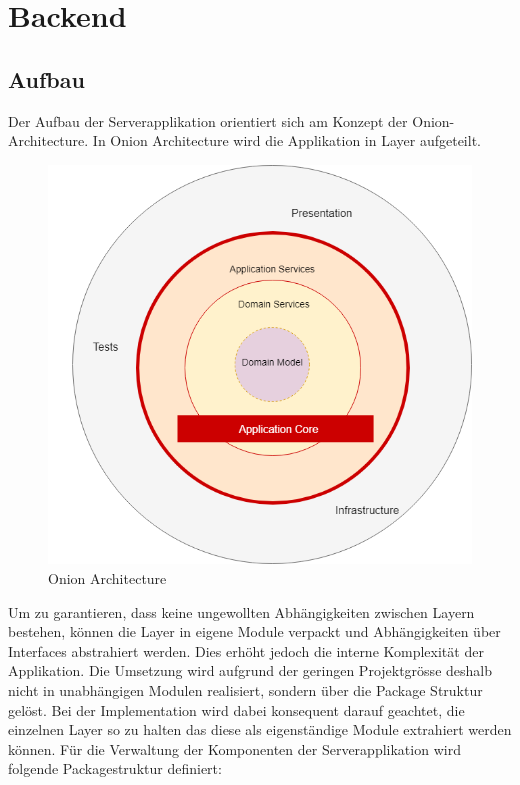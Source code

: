 \section{Backend}

\subsection{Aufbau}

Der Aufbau der Serverapplikation orientiert sich am Konzept der Onion-Architecture.
In Onion Architecture wird die Applikation in Layer aufgeteilt.

\begin{figure}[h]
    \centering
    \begin{minipage}[b]{0.4\textwidth}
        \includegraphics[width=\textwidth]{graphics/thinktocode-onion}
        \caption{Onion Architecture}
    \end{minipage}
\end{figure}

Um zu garantieren, dass keine ungewollten Abhängigkeiten zwischen Layern bestehen, können die Layer in eigene Module verpackt und Abhängigkeiten über Interfaces abstrahiert werden.
Dies erhöht jedoch die interne Komplexität der Applikation.
Die Umsetzung wird aufgrund der geringen Projektgrösse deshalb nicht in unabhängigen Modulen realisiert, sondern über die Package Struktur gelöst.
Bei der Implementation wird dabei konsequent darauf geachtet, die einzelnen Layer so zu halten das diese als eigenständige Module extrahiert werden können.
Für die Verwaltung der Komponenten der Serverapplikation wird folgende Packagestruktur definiert:

